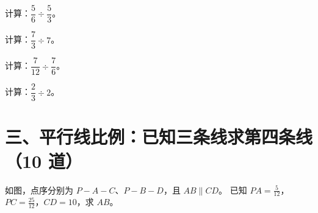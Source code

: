 \documentclass{exam-zh}
\begin{document}

\begin{problem}[points=5]
    计算：$\dfrac{5}{6}\div\dfrac{5}{3}$。

  \answerarea[22mm]
\end{problem}



\begin{problem}[points=5]
    计算：$\dfrac{7}{3}\div7$。

  \answerarea[22mm]
\end{problem}



\begin{problem}[points=5]
    计算：$\dfrac{7}{12}\div\dfrac{7}{6}$。

  \answerarea[22mm]
\end{problem}



\begin{problem}[points=5]
    计算：$\dfrac{2}{3}\div2$。

  \answerarea[22mm]
\end{problem}


\section*{三、平行线比例：已知三条线求第四条线（10 道）}


\begin{problem}[points=10]
  \noindent
  \begin{minipage}[t]{\dimexpr\linewidth-60mm-6mm\relax}
    \vspace{0pt}
    如图，点序分别为 $P-A-C$、$P-B-D$，且 $AB\parallel CD$。
已知 $PA=\frac{5}{12}$，$PC=\frac{25}{12}$，$CD=10$，求 $AB$。


  \end{minipage}\hfill
  \begin{diagramcoltikz}{60mm}{本题图}
  }
  \end{diagramcoltikz}
  \par\medskip
  \answerarea[38mm]
\end{problem}


\end{document}

